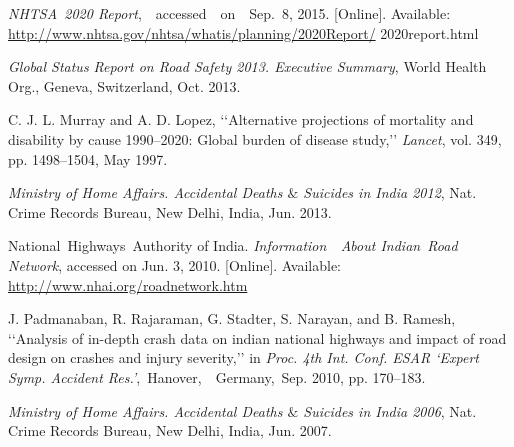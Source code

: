 \documentclass[14pt,a4paper,final]{extreport}
\begin{document}
\newpage
{}
\begin{thebibliography}{9}
{\fontsize{13pt}{8.4pt}\selectfont \textit{NHTSA\ 2020  Report},\ \ accessed\ \ on\ \ Sep.\  8,  2015.  [Online].  Available: \href{http://www.nhtsa.gov/nhtsa/whatis/planning/2020Report/}{http://www.nhtsa.gov/nhtsa/whatis/planning/2020Report/} 2020report.html\par}\par

{\fontsize{13pt}{8.4pt}\selectfont \textit{Global Status Report on Road Safety 2013. Executive Summary}, World Health Org., Geneva, Switzerland, Oct. 2013.\par}\par

{\fontsize{13pt}{8.4pt}\selectfont C. J. L. Murray and A. D. Lopez, ‘‘Alternative projections of mortality and disability by cause 1990–2020: Global burden of disease study,’’ \textit{Lancet}, vol. 349, pp. 1498–1504, May 1997.\par}\par

{\fontsize{13pt}{8.4pt}\selectfont \textit{Ministry of Home Affairs. Accidental Deaths $\&$  Suicides in India 2012}, Nat. Crime Records Bureau, New Delhi, India, Jun. 2013.\par}\par

{\fontsize{13pt}{8.4pt}\selectfont National\ Highways\ Authority of  India.  \textit{Information\ \ About  Indian\  Road Network}, accessed on Jun. 3, 2010. [Online]. Available: \href{http://www.nhai.org/roadnetwork.htm}{http://www.nhai.org/roadnetwork.htm}\par}\par

{\fontsize{13pt}{8.4pt}\selectfont J. Padmanaban, R. Rajaraman, G. Stadter, S. Narayan, and B. Ramesh, ‘‘Analysis of in-depth crash data on indian national highways and impact of road design on crashes and injury severity,’’ in \textit{Proc. 4th Int. Conf. ESAR ‘Expert Symp. Accident Res.’},\  Hanover,\ \ Germany,\  Sep.  2010, pp. 170–183.\par}\par

{\fontsize{13pt}{8.4pt}\selectfont \textit{Ministry of Home Affairs. Accidental Deaths $\&$  Suicides in India 2006}, Nat. Crime Records Bureau, New Delhi, India, Jun. 2007.\par}\par


\end{thebibliography}
\end{document}

